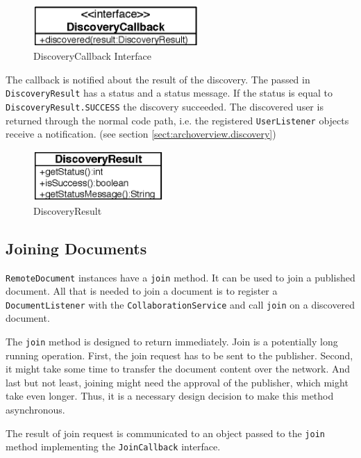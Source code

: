 \begin{figure}[H]
 \centering
 \includegraphics[width=6.28cm,height=1.55cm]{../images/finalreport/architecture_discoverycallback_uml.eps}
 \caption{DiscoveryCallback Interface}
\end{figure}

The callback is notified about the result of the discovery. The passed in
\texttt{Discovery\-Result} has a status and a status message. If the status
is equal to \texttt{Discovery\-Result.\-SUCCESS} the discovery succeeded. The
discovered user is returned through the normal code path, i.e. the
registered \texttt{User\-Listener} objects receive a notification. (see
section \ref{sect:archoverview.discovery})

\begin{figure}[H]
 \centering
 \includegraphics[width=4.94cm,height=1.91cm]{../images/finalreport/architecture_discoveryresult_uml.eps}
 \caption{DiscoveryResult}
\end{figure}


\subsection{Joining Documents}
\label{sect:archoverview.join}
\texttt{Remote\-Document} instances have a \texttt{join} method. It
can be used to join a published document. All that is needed to
join a document is to register a \texttt{Document\-Listener} with the 
\texttt{Collaboration\-Service} and call \texttt{join} on a discovered document.

The \texttt{join} method is designed to return immediately. Join is a 
potentially long running operation. First, the join request has to be sent
to the publisher. Second, it might take some time to transfer the document
content over the network. And last but not least, joining might need the 
approval of the publisher, which might take even longer. Thus, it is a 
necessary design decision to make this method asynchronous.

The result of join request is communicated to an object passed to the
\texttt{join} method implementing the \texttt{Join\-Callback} interface.


